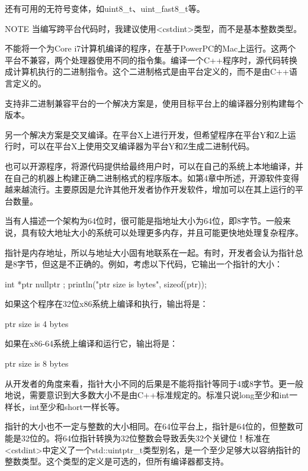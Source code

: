 还有可用的无符号变体，如uint8\_t、uint\_fast8\_t等。

\begin{myNotic}{NOTE}
当编写跨平台代码时，我建议使用<cstdint>类型，而不是基本整数类型。
\end{myNotic}


不能将一个为Core i7计算机编译的程序，在基于PowerPC的Mac上运行。这两个平台不兼容，两个处理器使用不同的指令集。编译一个C++程序时，源代码转换成计算机执行的二进制指令。这个二进制格式是由平台定义的，而不是由C++语言定义的。

支持非二进制兼容平台的一个解决方案是，使用目标平台上的编译器分别构建每个版本。

另一个解决方案是交叉编译。在平台X上进行开发，但希望程序在平台Y和Z上运行时，可以在平台X上使用交叉编译器为平台Y和Z生成二进制代码。

也可以开源程序，将源代码提供给最终用户时，可以在自己的系统上本地编译，并在自己的机器上构建正确二进制格式的程序版本。如第4章中所述，开源软件变得越来越流行。主要原因是允许其他开发者协作开发软件，增加可以在其上运行的平台数量。


当有人描述一个架构为64位时，很可能是指地址大小为64位，即8字节。一般来说，具有较大地址大小的系统可以处理更多内存，并且可能更快地处理复杂程序。

指针是内存地址，所以与地址大小固有地联系在一起。有时，开发者会认为指针总是8字节，但这是不正确的。例如，考虑以下代码，它输出一个指针的大小：

\begin{cpp}
int *ptr { nullptr };
println("ptr size is {} bytes", sizeof(ptr));
\end{cpp}

如果这个程序在32位x86系统上编译和执行，输出将是：

\begin{shell}
ptr size is 4 bytes
\end{shell}

如果在x86-64系统上编译和运行它，输出将是：

\begin{shell}
ptr size is 8 bytes
\end{shell}

从开发者的角度来看，指针大小不同的后果是不能将指针等同于4或8字节。更一般地说，需要意识到大多数大小不是由C++标准规定的。标准只说long至少和int一样长，int至少和short一样长等。

指针的大小也不一定与整数的大小相同。在64位平台上，指针是64位的，但整数可能是32位的。将64位指针转换为32位整数会导致丢失32个关键位！标准在<cstdint>中定义了一个std::uintptr\_t类型别名，是一个至少足够大以容纳指针的整数类型。这个类型的定义是可选的，但所有编译器都支持。

